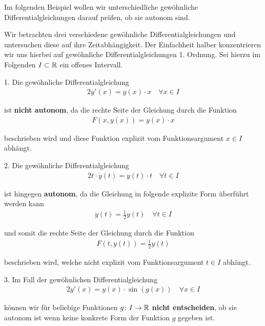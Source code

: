 \par
Im folgenden Beispiel wollen wir unterschiedliche gewöhnliche Differentialgleichungen darauf prüfen, ob sie autonom sind.
\label{ode/repetition:example-4}
\begin{example}{}{}



\par
Wir betrachten drei verschiedene gewöhnliche Differentialgleichungen und untersuchen diese auf ihre Zeitabhängigkeit.
Der Einfachheit halber konzentrieren wir uns hierbei auf gewöhnliche Differentialgleichungen 1. Ordnung.
Sei hierzu  im Folgenden \(I \subset \mathbb{R}\) ein offenes Intervall.

\par
1. Die gewöhnliche Differentialgleichung
\begin{align*}
2y'(x) = y(x)\cdot x \quad \forall x \in I
\end{align*}
\par
ist \textbf{nicht autonom}, da die rechte Seite der Gleichung durch die Funktion
\begin{align*}
F(x,y(x)) = y(x) \cdot x
\end{align*}
\par
beschrieben wird und diese Funktion explizit vom Funktionsargument \(x \in I\) abhängt.



\par
2. Die gewöhnliche Differentialgleichung
\begin{align*}
2t\cdot \dot{y}(t) = y(t)\cdot t \quad \forall t \in I
\end{align*}
\par
ist hingegen \textbf{autonom}, da die Gleichung in folgende explizite Form überführt werden kann
\begin{align*}
\dot{y}(t) = \frac{1}{2} y(t) \quad \forall t \in I
\end{align*}
\par
und somit die rechte Seite der Gleichung durch die Funktion
\begin{align*}
F(t,y(t)) = \frac{1}{2}y(t)
\end{align*}
\par
beschrieben wird, welche nicht explizit vom Funktionsargument \(t \in I\) abhängt.



\par
3. Im Fall der gewöhnlichen Differentialgleichung
\begin{align*}
2y'(x) = y(x)\cdot \sin(g(x)) \quad \forall x \in I
\end{align*}
\par
können wir für beliebige Funktionen \(g \colon I \rightarrow \mathbb{R}\) \textbf{nicht entscheiden}, ob sie autonom ist wenn keine konkrete Form der Funktion \(g\) gegeben ist.
\end{example}


